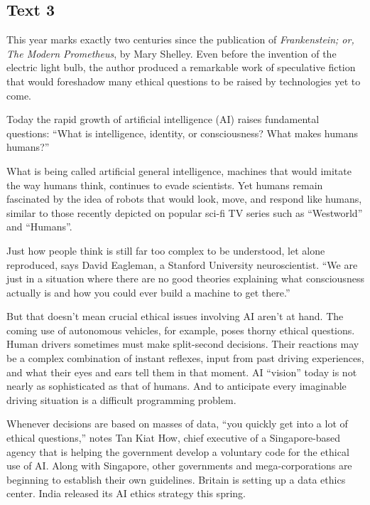 \newpage

\subsection{Text 3}

This year marks exactly two centuries since the publication of
\emph{Frankenstein; or, The Modern Prometheus}, by Mary Shelley. Even
before the invention of the electric light bulb, the author produced a
remarkable work of speculative fiction that would foreshadow many
ethical questions to be raised by technologies yet to come. 


Today the rapid growth of artificial intelligence (AI) raises fundamental
questions: ``What is intelligence, identity, or consciousness? What
makes humans humans?'' 


What is being called artificial general
intelligence, machines that would imitate the way humans think,
continues to evade scientists. Yet humans remain fascinated by the idea
of robots that would look, move, and respond like humans, similar to
those recently depicted on popular sci-fi TV series such as
``Westworld'' and ``Humans''. 



Just how people think is still far too
complex to be understood, let alone reproduced, says David Eagleman, a
Stanford University neuroscientist. ``We are just in a situation where
there are no good theories explaining what consciousness actually is and
how you could ever build a machine to get there.'' 


But that doesn't
mean crucial ethical issues involving AI aren't at hand. The coming use
of autonomous vehicles, for example, poses thorny ethical questions.
Human drivers sometimes must make split-second decisions. Their
reactions may be a complex combination of instant reflexes, input from
past driving experiences, and what their eyes and ears tell them in that
moment. AI ``vision'' today is not nearly as sophisticated as that of
humans. And to anticipate every imaginable driving situation is a
difficult programming problem. 


Whenever decisions are based on
masses of data, ``you quickly get into a lot of ethical questions,''
notes Tan Kiat How, chief executive of a Singapore-based agency that is
helping the government develop a voluntary code for the ethical use of
AI. Along with Singapore, other governments and mega-corporations are
beginning to establish their own guidelines. Britain is setting up a
data ethics center. India released its AI ethics strategy this spring.



